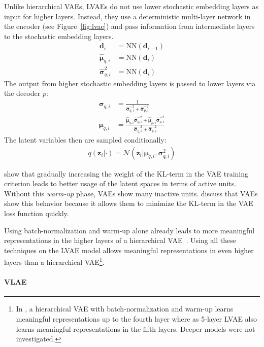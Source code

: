 Unlike hierarchical \acp{VAE}, \acp{LVAE} do not use lower stochastic embedding layers as input for higher layers.
Instead, they use a deterministic multi-layer network in the encoder (see Figure~\ref{fig:lvae}) and pass information from intermediate layers to the stochastic embedding layers.
\begin{align}
    \bm{d}_i &= \text{NN}(\bm{d}_{i-1})\\
    \hat{\bm{\mu}}_{q,i}&=\text{NN}(\bm{d}_i)\\
    \hat{\bm{\sigma}}^2_{q,i}&=\text{NN}(\bm{d}_i)
\end{align}
The output from higher stochastic embedding layers is passed to lower layers via the decoder $p$:
\begin{align}
    \bm{\sigma}_{q,i}&=\frac{1}{\hat{\bm{\sigma}}^{-2}_{q,i}+\hat{\bm{\sigma}}^{-2}_{p,i}}\\
    \bm{\mu}_{q,i}&=\frac{\hat{\bm{\mu}}_{q,i}\hat{\bm{\sigma}}^{-2}_{q,i}+\hat{\bm{\mu}}_{p,i}\hat{\bm{\sigma}}^{-2}_{p,i}}{\hat{\bm{\sigma}}^{-2}_{q,i}+\hat{\bm{\sigma}}^{-2}_{p,i}}
\end{align}
The latent variables then are sampled conditionally:
\begin{align}
    q(\bm{z}_i|\cdot)=\mathcal{N}(\bm{z}_i|\bm{\mu}_{q,i},\bm{\sigma}^2_{q,i})
\end{align}

\citet{sonderby2016ladder} show that gradually increasing the weight of the KL-term in the \ac{VAE} training criterion leads to better usage of the latent spaces in terms of active units.
Without this \textit{warm-up} phase, \acp{VAE} show many inactive units.
\citet{sonderby2016ladder} discuss that \acp{VAE} show this behavior because it allows them to minimize the KL-term in the \ac{VAE} loss function quickly.

Using batch-normalization and warm-up alone already leads to more meaningful representations in the higher layers of a hierarchical VAE~\citep{sonderby2016ladder}.
Using all these techniques on the \ac{LVAE} model allows meaningful representations in even higher layers than a hierarchical VAE\footnote{In \citet{sonderby2016ladder}, a hierarchical \ac{VAE} with batch-normalization and warm-up learns meaningful representations up to the fourth layer where as 5-layer \ac{LVAE} also learns meaningful representations in the fifth layers. Deeper models were not investigated.}.

\paragraph{\acl{VLAE}}

